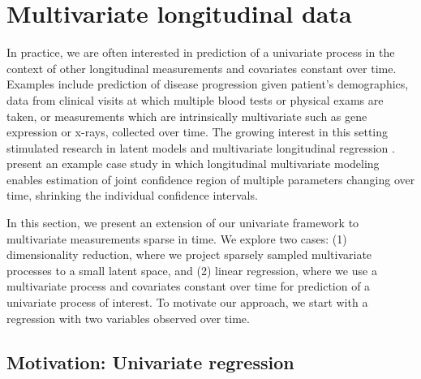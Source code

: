 \documentclass[preprint]{imsart}
\numberwithin{equation}{section}
\theoremstyle{plain}
\begin{document}
\section{Multivariate longitudinal data}\label{s:multivariate}

In practice, we are often interested in prediction of a univariate process in the context of other longitudinal measurements and covariates constant over time. Examples include prediction of disease progression given patient's demographics, data from clinical visits at which multiple blood tests or physical exams are taken, or measurements which are intrinsically multivariate such as gene expression or x-rays, collected over time. The growing interest in this setting stimulated research in latent models \citep{sammel1996latent} and multivariate longitudinal regression \citep{gray1998estimating,gray2000multidimensional}. \citet{diggle2002analysis} present an example case study in which longitudinal multivariate modeling enables estimation of joint confidence region of multiple parameters changing over time, shrinking the individual confidence intervals.

In this section, we present an extension of our univariate framework to multivariate measurements sparse in time. We explore two cases: (1) dimensionality reduction, where we project sparsely sampled multivariate processes to a small latent space, and (2) linear regression, where we use a multivariate process and covariates constant over time for prediction of a univariate process of interest. To motivate our approach, we start with a regression with two variables observed over time.


\subsection{Motivation: Univariate regression}
\end{document}
